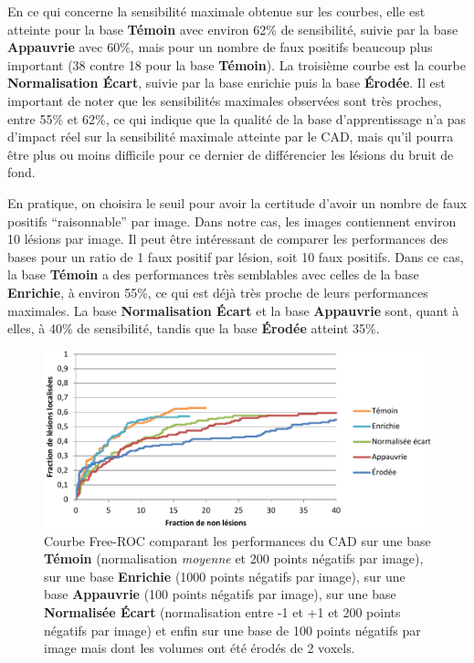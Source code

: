 En ce qui concerne la sensibilité maximale obtenue sur les courbes, elle est atteinte pour la base \textbf{Témoin} avec environ 62\% de sensibilité, suivie par la base \textbf{Appauvrie} avec 60\%, mais pour un nombre de faux positifs beaucoup plus important (38 contre 18 pour la base \textbf{Témoin}). La troisième courbe est la courbe \textbf{Normalisation Écart}, suivie par la base enrichie puis la base \textbf{Érodée}. Il est important de noter que les sensibilités maximales observées sont très proches, entre 55\% et 62\%, ce qui indique que la qualité de la base d'apprentissage n'a pas d'impact réel sur la sensibilité maximale atteinte par le CAD, mais qu'il pourra être plus ou moins difficile pour ce dernier de différencier les lésions du bruit de fond. 

En pratique, on choisira le seuil pour avoir la certitude d'avoir un nombre de faux positifs ``raisonnable'' par image. Dans notre cas, les images contiennent environ 10 lésions par image. Il peut être intéressant de comparer les performances des bases pour un ratio de 1 faux positif par lésion, soit 10 faux positifs. Dans ce cas, la base \textbf{Témoin} a des performances très semblables avec celles de la base \textbf{Enrichie}, à environ 55\%, ce qui est déjà très proche de leurs performances maximales. La base \textbf{Normalisation Écart} et la base \textbf{Appauvrie} sont, quant à elles, à 40\% de sensibilité, tandis que la base \textbf{Érodée} atteint 35\%.


\begin{figure}[h!]
 
 \begin{center}
   \includegraphics[width=15cm]{images/FROC_param}
 \end{center}
 \caption[Courbe Free-ROC comparant les performances du CAD selon les différents paramètres de base d'apprentissage]{Courbe Free-ROC comparant les performances du CAD sur une base \textbf{Témoin} (normalisation \emph{moyenne} et 200 points négatifs par image), sur une base \textbf{Enrichie} (1000 points négatifs par image), sur une base \textbf{Appauvrie} (100 points négatifs par image), sur une base \textbf{Normalisée Écart} (normalisation entre -1 et +1 et 200 points négatifs par image) et enfin sur une base de 100 points négatifs par image mais dont les volumes ont été érodés de 2 voxels.}
 \label{lab:froc_comp_static}
\end{figure}


